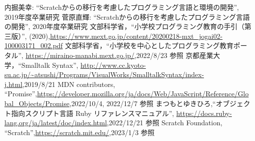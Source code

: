 \documentclass[10pt,a4j]{ltjsarticle}
\begin{document}
\begin{thebibliography}{99}
 内掘美幸: ``Scratchからの移行を考慮したプログラミング言語と環境の開発'', 2019年度卒業研究
 菅原直輝: ``Scratchからの移行を考慮したプログラミング言語の開発'', 2020年度卒業研究
 文部科学省，``小学校プログラミング教育の手引（第三版）'', (2020),\url{https://www.mext.go.jp/content/20200218-mxt_jogai02-100003171_002.pdf}
 文部科学省，``小学校を中心としたプログラミング教育ポータル'', \url{https://miraino-manabi.mext.go.jp/},2022/8/23 参照
 京都産業大学，``Smalltalk Syntax'', \url{http://www.cc.kyoto-su.ac.jp/~atsushi/Programs/VisualWorks/SmalltalkSyntax/index-j.html},2019/8/21
 MDN contributors, ``Promise'',\url{https://developer.mozilla.org/ja/docs/Web/JavaScript/Reference/Global_Objects/Promise},2022/10/4, 2022/12/7 参照
 まつもとゆきひろ,``オブジェクト指向スクリプト言語 Ruby リファレンスマニュアル'',
\url{https://docs.ruby-lang.org/ja/latest/doc/index.html},2022/12/21 参照
 Scratch Foundation, ``Scratch'',\url{https://scratch.mit.edu/},2023/1/3 参照
\end{thebibliography}
\end{document}

